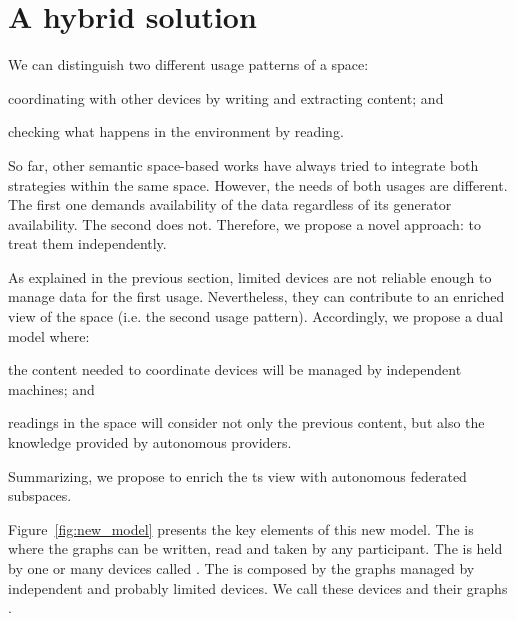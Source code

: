 \section{A hybrid solution} %
\label{sec:hybrid_solution}

We can distinguish two different usage patterns of a space:
\begin{enumerate*}[label=\itshape(\arabic*\upshape)]
  \item coordinating with other devices by writing and extracting content; and %
  \item checking what happens in the environment by reading.
\end{enumerate*}
So far, other semantic space-based works have always tried to integrate both strategies within the same space.
However, the needs of both usages are different.
The first one demands availability of the data regardless of its generator availability.
The second does not. %
Therefore, we propose a novel approach: to treat them independently.



As explained in the previous section, limited devices are not reliable enough to manage data for the first usage.
Nevertheless, they can contribute to an enriched view of the space (i.e. the second usage pattern).
Accordingly, we propose a dual model where:
\begin{enumerate*}[label=\itshape(\arabic*\upshape)]
  \item the content needed to coordinate devices will be managed by independent machines; and
  \item readings in the space will consider not only the previous content, but also the knowledge provided by autonomous providers.
\end{enumerate*}
Summarizing, we propose to enrich the \ac{ts} view with autonomous federated subspaces.


Figure~\ref{fig:new_model} presents the key elements of this new model.
The \coordspace{} is where the graphs can be written, read and taken by any participant.
The \coordspace{} is held by one or many devices called \coordinators{}.
The \outerspace{} is composed by the graphs managed by independent and probably limited devices.
We call these devices \asteroids{} and their graphs \selfgraphs{}.


